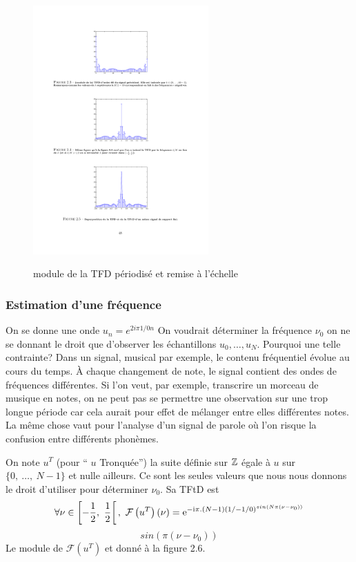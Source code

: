 \begin{figure}
  \centering
  \includegraphics[width=0.6\textwidth]{Figures/Figure2-4}\\
  \caption{module de la TFD p\'eriodis\'e et remise \`a l'\'echelle}\label{fig:figure2-4}
\end{figure}

\subsubsection{Estimation d'une fr\'equence}
On se donne une onde $u_{n}=e^{2i\pi 1/0n}$ On voudrait d\'{e}terminer la fr\'{e}quence $\nu_{0}$ on ne se donnant le droit que d'observer les \'{e}chantillons $u_{0}, \ldots, u_{N}$. Pourquoi une telle contrainte? Dans un signal, musical par exemple, le contenu fr\'{e}quentiel \'{e}volue au cours du temps. \`{A} chaque changement de note, le signal contient des ondes de fr\'{e}quences diff\'{e}rentes. Si l'on veut, par exemple, transcrire un morceau de musique en notes, on ne peut pas se permettre une observation sur une trop longue p\'{e}riode car cela aurait pour effet de m\'{e}langer entre elles diff\'{e}rentes notes. La m\^{e}me chose vaut pour l'analyse d'un signal de parole o\`{u} l'on risque la confusion entre diff\'{e}rents phon\`{e}mes.

On note $u^{T}$ (pour `` $u$ Tronqu\'{e}e'') la suite d\'{e}finie sur $\mathbb{Z}$ \'{e}gale \`{a} $u$ sur $\{0,\ \ldots,\ N-1\}$ et nulle ailleurs. Ce sont les seules valeurs que nous nous donnons le droit d'utiliser pour d\'{e}terminer $\nu_{0}$. Sa TFtD est
$$
\forall\nu\in \left[-\frac{1}{2},\ \frac{1}{2}\right[,\ \mathcal{F}\left( u^{T} \right)(\nu)=\mathrm{e}^{-\mathrm{i} \pi.(N-1)(1/-1/0)^{sin(N\pi(\nu-\nu_{0}))}}
$$
$$
sin(\pi(\nu-\nu_{0}))
$$
Le module de $\mathcal{F}(u^{T})$ et donn\'{e} \`{a} la figure 2.6.

